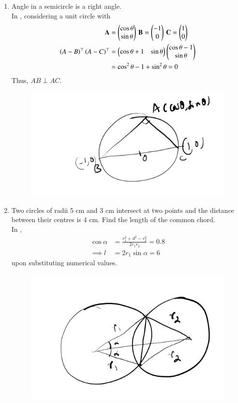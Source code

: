 \begin{enumerate}[label=\thesubsection.\arabic*,ref=\thesubsection.\theenumi]
\begin{figure}[H]
\begin{center}
	\end{center}
	\caption{}
	\label{fig:ncert-circ-10}	
\end{figure}
%
 \item  Angle in a semicircle is a right angle. 
	\\
		\solution 
	In , considering a unit circle	
	with
\begin{align}
	\mathbf{A}&= \begin{pmatrix}\cos \theta \\ \sin \theta\end{pmatrix}\,
	\mathbf{B}= \begin{pmatrix}-1 \\ 0\end{pmatrix}\,
	\mathbf{C}= \begin{pmatrix}1 \\ 0\end{pmatrix}
	\\
	\left(A-B\right)^{\top}
	\left(A-C\right)^{\top}
	&=
	 \begin{pmatrix}\cos \theta+1 & \sin \theta\end{pmatrix}
\begin{pmatrix}\cos \theta -1 \\ \sin \theta\end{pmatrix}
\\
	&=\cos^2\theta -1 + \sin^2\theta = 0
\end{align}
Thus, $AB \perp AC$.
\begin{figure}[H]
	\begin{center}
		{\includegraphics[width=0.6\columnwidth]{figs/ncert/circle/2.png}}
	\end{center}
	\caption{}
	\label{fig:ncert-circ-2}	
\end{figure}
%
%
\item Two circles of radii 5 cm and 3 cm intersect at two points and the distance between their centres is 4 cm. Find the length of the common chord.
	\\
		\solution 
	In , 
\begin{align}
	\cos \alpha &= \frac{r_1^2+d^2-r_2^2}{2r_1r_2} = 0.8
	\\
\implies	l &= 2r_1\sin \alpha = 6
\end{align}
upon substituting numerical values.
\begin{figure}[H]
	\begin{center}
		{\includegraphics[width=0.6\columnwidth]{figs/ncert/circle/3.png}}

\end{center}
\end{figure}
\end{enumerate}
